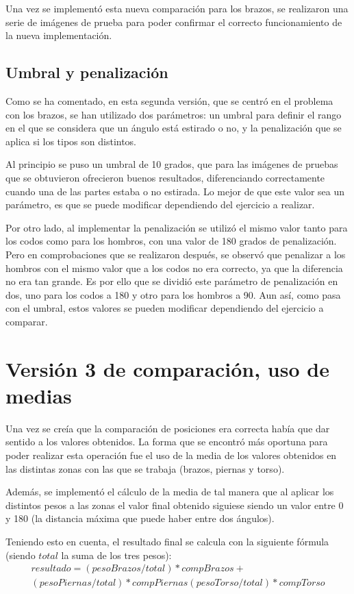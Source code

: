 {Una vez se implementó esta nueva comparación para los brazos, se realizaron una serie de imágenes de prueba para poder confirmar el correcto funcionamiento de la nueva implementación.

\subsection{Umbral y penalización}
Como se ha comentado, en esta segunda versión, que se centró en el problema con los brazos, se han utilizado dos parámetros: un umbral para definir el rango en el que se considera que un ángulo está estirado o no, y la penalización que se aplica si los tipos son distintos.

Al principio se puso un umbral de 10 grados, que para las imágenes de pruebas que se obtuvieron ofrecieron buenos resultados, diferenciando correctamente cuando una de las partes estaba o no estirada. Lo mejor de que este valor sea un parámetro, es que se puede modificar dependiendo del ejercicio a realizar.

Por otro lado, al implementar la penalización se utilizó el mismo valor tanto para los codos como para los hombros, con una valor de 180 grados de penalización. Pero en comprobaciones que se realizaron después, se observó que penalizar a los hombros con el mismo valor que a los codos no era correcto, ya que la diferencia no era tan grande. Es por ello que se dividió este parámetro de penalización en dos, uno para los codos a 180 y otro para los hombros a 90. Aun así, como pasa con el umbral, estos valores se pueden modificar dependiendo del ejercicio a comparar.

\section{Versión 3 de comparación, uso de medias}
Una vez se creía que la comparación de posiciones era correcta había que dar sentido a los valores obtenidos. La forma que se encontró más oportuna para poder realizar esta operación fue el uso de la media de los valores obtenidos en las distintas zonas con las que se trabaja (brazos, piernas y torso).

Además, se implementó el cálculo de la media de tal manera que al aplicar los distintos pesos a las zonas el valor final obtenido siguiese siendo un valor entre 0 y 180 (la distancia máxima que puede haber entre dos ángulos).

Teniendo esto en cuenta, el resultado final se calcula con la siguiente fórmula (siendo $total$ la suma de los tres pesos):
\begin{equation}
\begin{split}
resultado = (pesoBrazos/total)*compBrazos +\\ (pesoPiernas/total)*compPiernas (pesoTorso/total)*compTorso
\end{split}
\end{equation}

}

